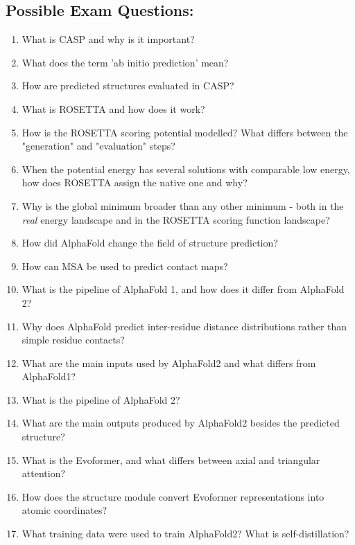 \subsection*{Possible Exam Questions:}
\begin{enumerate}
\item{What is CASP and why is it important? \done}
\item{What does the term 'ab initio prediction' mean? \done}
\item{How are predicted structures evaluated in CASP? \done}
\vspace{0.8em}
\item{What is ROSETTA and how does it work? \done}
\item{How is the ROSETTA scoring potential modelled? What differs between the "generation" and "evaluation" steps? \done}
\item{When the potential energy has several solutions with comparable low energy, how does ROSETTA assign the native one and why? \done}
\item {Why is the global minimum broader than any other minimum - both in the \textit{real} energy landscape and in the ROSETTA scoring function landscape? \done}
\vspace{0.8em}
\item{How did AlphaFold change the field of structure prediction?}
\item{How can MSA be used to predict contact maps? \done}
\item{What is the pipeline of AlphaFold 1, and how does it differ from AlphaFold 2? \done}
\item{Why does AlphaFold predict inter-residue distance distributions rather than simple residue contacts?\done}
\vspace{0.8em}
\item{What are the main inputs used by AlphaFold2 and what differs from AlphaFold1? \done}
\item{What is the pipeline of AlphaFold 2? \done}
\item{What are the main outputs produced by AlphaFold2 besides the predicted structure? \done}
\item{What is the Evoformer, and what differs between axial and triangular attention? \done}
\item{How does the structure module convert Evoformer representations into atomic coordinates? \done}
\item{What training data were used to train AlphaFold2? What is self-distillation?}

\end{enumerate}

